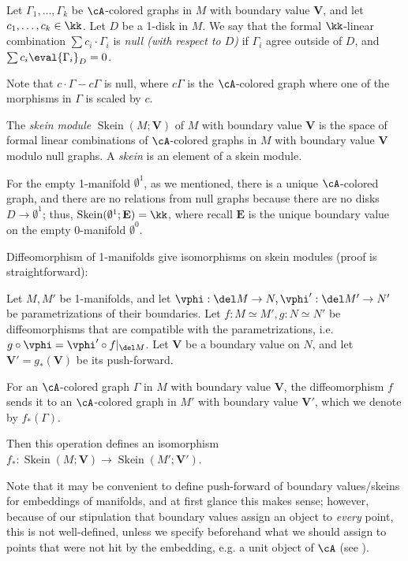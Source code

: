 \documentclass[12pt]{article}
\newcommand{\empt}[1]{{\emptyset^{#1}}}
\newcommand{\VV}{{\mathbf{V}}}
\newcommand{\EE}{{\mathbf{E}}}
\DeclareMathOperator{\Skein}{Skein}
\begin{document}
\begin{definition}
\label{d:null-graph}
Let $\Gamma_1,\ldots,\Gamma_k$ be $\cA$-colored graphs in $M$
with boundary value $\VV$,
and let $c_1,\ldots,c_k \in \kk$.
Let $D$ be a 1-disk in $M$.
We say that the formal $\kk$-linear combination
$\sum c_i \cdot \Gamma_i$ is
\emph{null (with respect to $D$)}
if $\Gamma_i$ agree outside of $D$,
and $\sum c_i \eval{\Gamma_i}_D = 0$.
\end{definition}

Note that $c \cdot \Gamma - c\Gamma$ is null,
where $c\Gamma$ is the $\cA$-colored graph
where one of the morphisms in $\Gamma$ is scaled by $c$.

\begin{definition}
\label{d:skein}
The \emph{skein module} $\Skein(M;\VV)$
of $M$ with boundary value $\VV$
is the space of formal linear combinations of
$\cA$-colored graphs in $M$ with boundary value $\VV$
modulo null graphs.
A \emph{skein} is an element of a skein module.
\end{definition}


For the empty 1-manifold $\empt{1}$,
as we mentioned, there is a unique $\cA$-colored graph,
and there are no relations from null graphs
because there are no disks $D \to \empt{1}$;
thus, $\Skein(\empt{1};\EE) = \kk$,
where recall $\EE$ is the unique boundary value on
the empty 0-manifold $\empt{0}$.

Diffeomorphism of 1-manifolds give isomorphisms
on skein modules (proof is straightforward):

\begin{proposition}
\label{p:diffeo}
Let $M, M'$ be 1-manifolds,
and let $\vphi: \del M \to N, \vphi': \del M' \to N'$
be parametrizations of their boundaries.
Let $f: M \simeq M', g: N \simeq N'$ be diffeomorphisms
that are compatible with the parametrizations,
i.e. $g \circ \vphi = \vphi' \circ f|_{\del M}$.
Let $\VV$ be a boundary value on $N$,
and let $\VV' = g_*(\VV)$ be its push-forward.

For an $\cA$-colored graph $\Gamma$ in $M$
with boundary value $\VV$,
the diffeomorphism $f$ sends it to
an $\cA$-colored graph in $M'$
with boundary value $\VV'$,
which we denote by $f_*(\Gamma)$.

Then this operation defines an isomorphism
$f_*: \Skein(M;\VV) \to \Skein(M';\VV')$.
\end{proposition}

Note that it may be convenient to define push-forward
of boundary values/skeins for embeddings of manifolds,
and at first glance this makes sense;
however, because of our stipulation that
boundary values assign an object to \emph{every} point,
this is not well-defined,
unless we specify beforehand
what we should assign to points that were not hit
by the embedding, e.g. a unit object of $\cA$
(see ).
\end{document}

